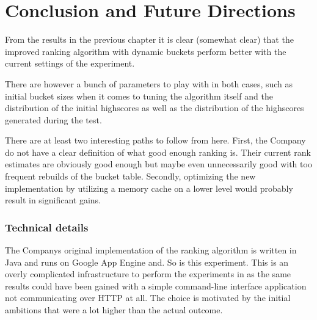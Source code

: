 \chapter{Conclusion and Future Directions}

From the results in the previous chapter it is clear (somewhat clear) that the improved ranking algorithm with dynamic buckets perform better with the current settings of the experiment.

There are however a bunch of parameters to play with in both cases, such as initial bucket sizes when it comes to tuning the algorithm itself and the distribution of the initial highscores as well as the distribution of the highscores generated during the test.

There are at least two interesting paths to follow from here. First, the Company do not have a clear definition of what good enough ranking is. Their current rank estimates are obviously good enough but maybe even unnecessarily good with too frequent rebuilds of the bucket table. Secondly, optimizing the new implementation by utilizing a memory cache on a lower level would probably result in significant gains.


\subsection{Technical details}

The Companys original implementation of the ranking algorithm is written in Java and runs on Google App Engine and. So is this experiment. This is an overly complicated infrastructure to perform the experiments in as the same results could have been gained with a simple command-line interface application not communicating over HTTP at all. The choice is motivated by the initial ambitions that were a lot higher than the actual outcome.
 
